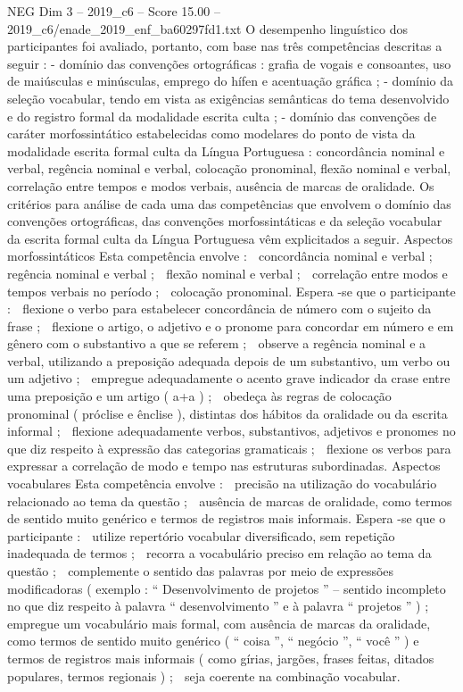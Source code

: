 \begin{textsample}{NEG Dim 3 – 2019\_c6 – Score 15.00 – 2019\_c6/enade\_2019\_enf\_ba60297fd1.txt}
O desempenho linguístico dos participantes foi avaliado, portanto, com base nas três competências descritas a seguir : - domínio das convenções ortográficas : grafia de vogais e consoantes, uso de maiúsculas e minúsculas, emprego do hífen e acentuação gráfica ; - domínio da seleção vocabular, tendo em vista as exigências semânticas do tema desenvolvido e do registro formal da modalidade escrita culta ; - domínio das convenções de caráter morfossintático estabelecidas como modelares do ponto de vista da modalidade escrita formal culta da Língua Portuguesa : concordância nominal e verbal, regência nominal e verbal, colocação pronominal, flexão nominal e verbal, correlação entre tempos e modos verbais, ausência de marcas de oralidade.
Os critérios para análise de cada uma das competências que envolvem o domínio das convenções ortográficas, das convenções morfossintáticas e da seleção vocabular da escrita formal culta da Língua Portuguesa vêm explicitados a seguir.
Aspectos morfossintáticos Esta competência envolve :  concordância nominal e verbal ;  regência nominal e verbal ;  flexão nominal e verbal ;  correlação entre modos e tempos verbais no período ;  colocação pronominal.
Espera -se que o participante :  flexione o verbo para estabelecer concordância de número com o sujeito da frase ;  flexione o artigo, o adjetivo e o pronome para concordar em número e em gênero com o substantivo a que se referem ;  observe a regência nominal e a verbal, utilizando a preposição adequada depois de um substantivo, um verbo ou um adjetivo ;  empregue adequadamente o acento grave indicador da crase entre uma preposição e um artigo ( a+a ) ;  obedeça às regras de colocação pronominal ( próclise e ênclise ), distintas dos hábitos da oralidade ou da escrita informal ;  flexione adequadamente verbos, substantivos, adjetivos e pronomes no que diz respeito à expressão das categorias gramaticais ;  flexione os verbos para expressar a correlação de modo e tempo nas estruturas subordinadas.
Aspectos vocabulares Esta competência envolve :  precisão na utilização do vocabulário relacionado ao tema da questão ;  ausência de marcas de oralidade, como termos de sentido muito genérico e termos de registros mais informais.
Espera -se que o participante :  utilize repertório vocabular diversificado, sem repetição inadequada de termos ;  recorra a vocabulário preciso em relação ao tema da questão ;  complemente o sentido das palavras por meio de expressões modificadoras ( exemplo : “ Desenvolvimento de projetos ” – sentido incompleto no que diz respeito à palavra “ desenvolvimento ” e à palavra “ projetos ” ) ;  empregue um vocabulário mais formal, com ausência de marcas da oralidade, como termos de sentido muito genérico ( “ coisa ”, “ negócio ”, “ você ” ) e termos de registros mais informais ( como gírias, jargões, frases feitas, ditados populares, termos regionais ) ;  seja coerente na combinação vocabular.

\end{textsample}
